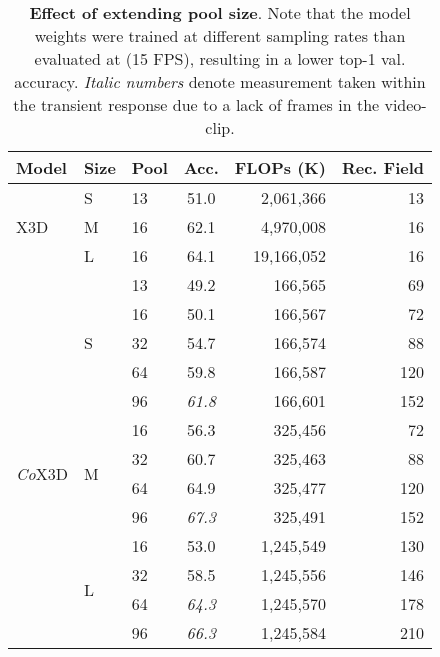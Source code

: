\documentclass[runningheads]{llncs}
\begin{document}
\begin{table}[b!]
	\begin{center}
	
\begin{tabular}{lllcrr}
		\toprule
		\textbf{Model}  & \textbf{Size} & \textbf{Pool} & \textbf{Acc.} & \textbf{FLOPs (K)} & \textbf{Rec. Field} \\
		\midrule
		\multirow{3}{*}{X3D} 
		                & S             & 13            & 51.0          & 2,061,366 & 13                 \\
		                & M             & 16            & 62.1          & 4,970,008 & 16                 \\
		                & L             & 16            & 64.1          & 19,166,052 & 16                 \\
		\midrule
&\multirow{5}{*}{S}         & 13            & 49.2          & 166,565 & 69                 \\
		                &               & 16            & 50.1          & 166,567 & 72                 \\
		                &               & 32            & 54.7          & 166,574 & 88                 \\
		                &               & 64            & 59.8          & 166,587 & 120                \\
		                &               & 96            &\textit{61.8}  & 166,601 & 152                \\
		                \cline{2-6}
 		\multirow{4}{*}{\textit{Co}X3D}
		    &\multirow{4}{*}{M}         & 16            & 56.3          & 325,456 & 72                 \\
		                &               & 32            & 60.7          & 325,463 & 88                 \\
		                &               & 64            & 64.9          & 325,477 & 120                \\
		                &               & 96            &\textit{67.3 } & 325,491 & 152                \\
		                \cline{2-6}
		    &\multirow{4}{*}{L}         & 16            & 53.0          & 1,245,549 & 130                \\
		                &               & 32            & 58.5          & 1,245,556 & 146                \\
		                &               & 64            &\textit{64.3}  & 1,245,570 & 178                \\
		                &               & 96            &\textit{66.3}  & 1,245,584 & 210                \\

		\bottomrule
	\end{tabular}
	\end{center}
\caption{\textbf{Effect of extending pool size}. Note that the model weights were trained at different sampling rates than evaluated at (15 FPS), resulting in a lower top-1 val. accuracy.
\textit{Italic numbers} denote measurement taken within the transient response due to a lack of frames in the video-clip.
	}
\label{tab:extended_window_size}
\end{table}
\end{document}
